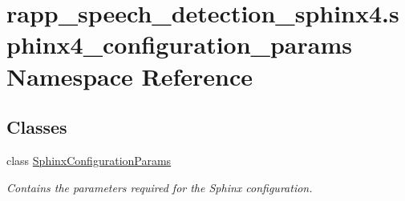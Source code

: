 \hypertarget{namespacerapp__speech__detection__sphinx4_1_1sphinx4__configuration__params}{\section{rapp\-\_\-speech\-\_\-detection\-\_\-sphinx4.\-sphinx4\-\_\-configuration\-\_\-params Namespace Reference}
\label{namespacerapp__speech__detection__sphinx4_1_1sphinx4__configuration__params}
}
\subsection*{Classes}
\begin{DoxyCompactItemize}
\item 
class \hyperlink{classrapp__speech__detection__sphinx4_1_1sphinx4__configuration__params_1_1SphinxConfigurationParams}{Sphinx\-Configuration\-Params}
\begin{DoxyCompactList}\small\item\em Contains the parameters required for the Sphinx configuration. \end{DoxyCompactList}\end{DoxyCompactItemize}
